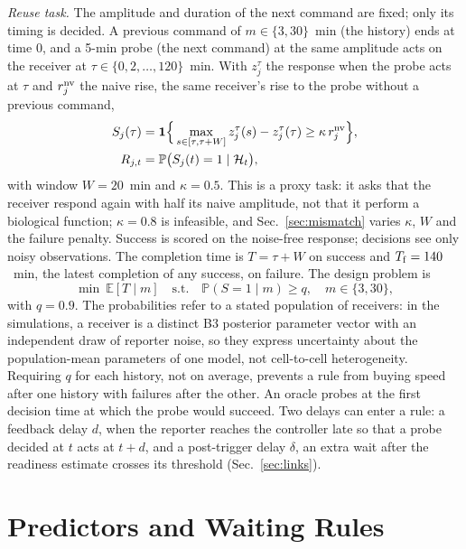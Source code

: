 \documentclass[conference]{IEEEtran}
\newcommand{\E}{\mathbb{E}}
\newcommand{\Prob}{\mathbb{P}}
\newcommand{\Hist}{\mathcal{H}}
\newcommand{\ind}{\mathbf{1}}
\begin{document}
\emph{Reuse task.} The amplitude and duration of the next command are fixed; only its timing is decided. A previous command of $m\in\{3,30\}$~min (the history) ends at time 0, and a 5-min probe (the next command) at the same amplitude acts on the receiver at $\tau\in\{0,2,\ldots,120\}$~min. With $z_j^{\tau}$ the response when the probe acts at $\tau$ and $r^{\rm nv}_j$ the naive rise, the same receiver's rise to the probe without a previous command,
\begin{equation}
 \begin{aligned}
 S_j(\tau)&=\ind\Big\{\max_{s\in[\tau,\tau+W]}z_j^{\tau}(s)-z_j^{\tau}(\tau)\geq\kappa\,r^{\rm nv}_j\Big\},\\
 R_{j,t}&=\Prob\big(S_j(t)=1\mid\Hist_t\big),
 \end{aligned}
 \label{eq:task}
\end{equation}
with window $W=20$~min and $\kappa=0.5$. This is a proxy task: it asks that the receiver respond again with half its naive amplitude, not that it perform a biological function; $\kappa=0.8$ is infeasible, and Sec.~\ref{sec:mismatch} varies $\kappa$, $W$ and the failure penalty. Success is scored on the noise-free response; decisions see only noisy observations. The completion time is $T=\tau+W$ on success and $T_{\rm f}=140$~min, the latest completion of any success, on failure. The design problem is
\begin{equation}
 \min\ \E[T\mid m]\quad\text{s.t.}\quad \Prob(S=1\mid m)\geq q,\quad m\in\{3,30\},
 \label{eq:design}
\end{equation}
with $q=0.9$. The probabilities refer to a stated population of receivers: in the simulations, a receiver is a distinct B3 posterior parameter vector with an independent draw of reporter noise, so they express uncertainty about the population-mean parameters of one model, not cell-to-cell heterogeneity. Requiring $q$ for each history, not on average, prevents a rule from buying speed after one history with failures after the other. An oracle probes at the first decision time at which the probe would succeed. Two delays can enter a rule: a feedback delay $d$, when the reporter reaches the controller late so that a probe decided at $t$ acts at $t+d$, and a post-trigger delay $\delta$, an extra wait after the readiness estimate crosses its threshold (Sec.~\ref{sec:links}).

\section{Predictors and Waiting Rules}
\end{document}

